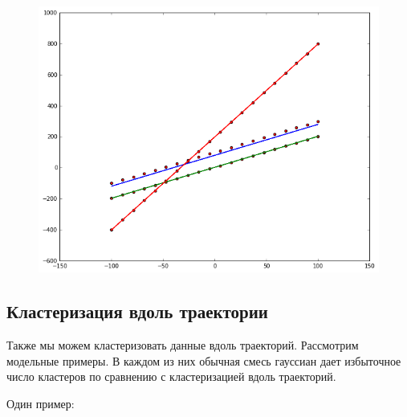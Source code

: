 \begin{figure}[H]
   \includegraphics[scale=0.15]{figures/final_iter_cross.png}
 \end{figure}
\newpage

\subsection{Кластеризация вдоль траектории}
Также мы можем кластеризовать данные вдоль траекторий. Рассмотрим модельные примеры. В каждом из них обычная смесь гауссиан дает избыточное число кластеров по сравнению с кластеризацией вдоль траекторий.

Один пример:

